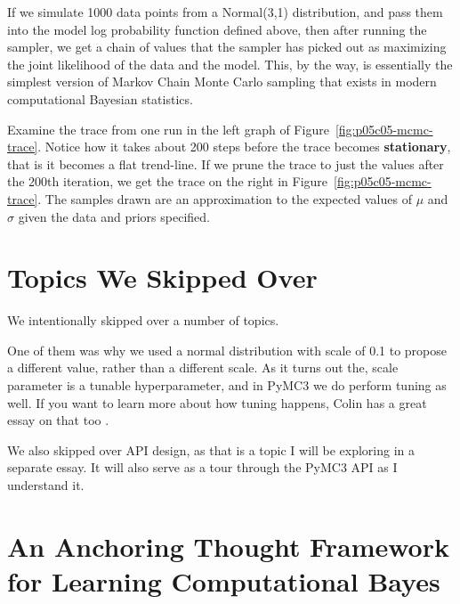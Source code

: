 If we simulate 1000 data points from a Normal(3,1) distribution, and pass them into the model log probability function defined above, then after running the sampler, we get a chain of values that the sampler has picked out as maximizing the joint likelihood of the data and the model. This, by the way, is essentially the simplest version of Markov Chain Monte Carlo sampling that exists in modern computational Bayesian statistics.

Examine the trace from one run in the left graph of Figure~\ref{fig:p05c05-mcmc-trace}. Notice how it takes about 200 steps before the trace becomes \textbf{stationary}, that is it becomes a flat trend-line. If we prune the trace to just the values after the 200th iteration, we get the trace on the right in Figure~\ref{fig:p05c05-mcmc-trace}.
The samples drawn are an approximation to the expected values of $\mu$
and $\sigma$ given the data and priors specified.

\section{Topics We Skipped Over}

We intentionally skipped over a number of topics.

One of them was why we used a normal distribution with scale of 0.1 to propose a different value, rather than a different scale. As it turns out the, scale parameter is a tunable hyperparameter, and in PyMC3 we do perform tuning as well. If you want to learn more about how tuning happens, Colin has a great essay on that too \cite{ColinCarrollParameterAdaptationPyMC32019}.

We also skipped over API design, as that is a topic I will be exploring in a separate essay. It will also serve as a tour through the PyMC3 API as I understand it.

\section{An Anchoring Thought Framework for Learning Computational Bayes}

